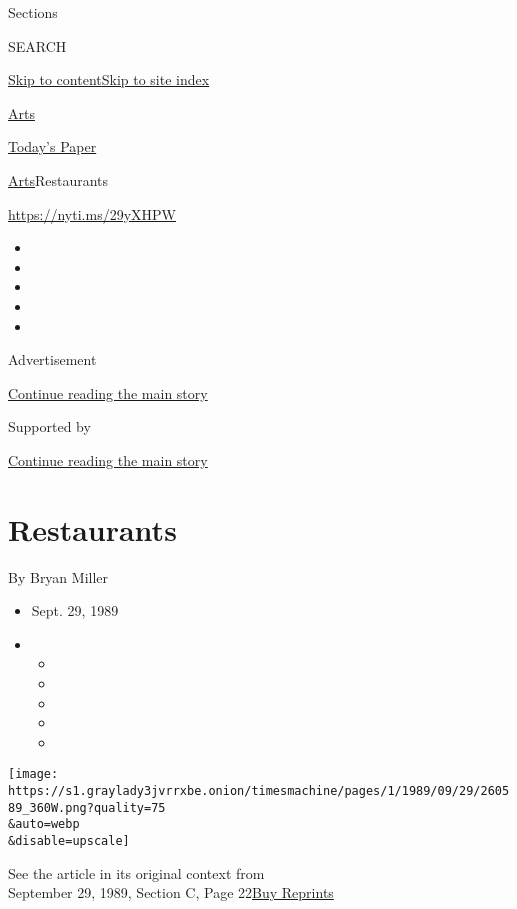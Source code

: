 Sections

SEARCH

\protect\hyperlink{site-content}{Skip to
content}\protect\hyperlink{site-index}{Skip to site index}

\href{https://www.nytimes3xbfgragh.onion/section/arts}{Arts}

\href{https://myaccount.nytimes3xbfgragh.onion/auth/login?response_type=cookie\&client_id=vi}{}

\href{https://www.nytimes3xbfgragh.onion/section/todayspaper}{Today's
Paper}

\href{/section/arts}{Arts}\textbar{}Restaurants

\url{https://nyti.ms/29yXHPW}

\begin{itemize}
\item
\item
\item
\item
\item
\end{itemize}

Advertisement

\protect\hyperlink{after-top}{Continue reading the main story}

Supported by

\protect\hyperlink{after-sponsor}{Continue reading the main story}

\hypertarget{restaurants}{%
\section{Restaurants}\label{restaurants}}

By Bryan Miller

\begin{itemize}
\item
  Sept. 29, 1989
\item
  \begin{itemize}
  \item
  \item
  \item
  \item
  \item
  \end{itemize}
\end{itemize}

\texttt{[image: https://s1.graylady3jvrrxbe.onion/timesmachine/pages/1/1989/09/29/260589\_360W.png?quality=75\\\&auto=webp\\\&disable=upscale]}

See the article in its original context from\\
September 29, 1989, Section C, Page
22\href{https://store.nytimes3xbfgragh.onion/collections/new-york-times-page-reprints?utm_source=nytimes\&utm_medium=article-page\&utm_campaign=reprints}{Buy
Reprints}

